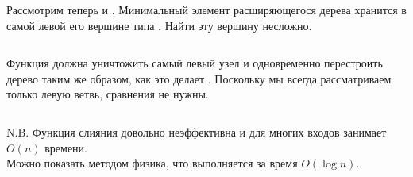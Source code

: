 \begin{frame}[fragile]{}
Рассмотрим теперь  и
. Минимальный элемент расширяющегося дерева
хранится в самой левой его вершине типа . Найти эту
вершину несложно.
\inputminted[firstline=42,lastline=44,gobble=2] {haskell}{code/SplayHeap.lhs}

Функция  должна уничтожить самый левый узел и
одновременно перестроить дерево таким же образом, как это делает
. Поскольку мы всегда рассматриваем только левую
ветвь, сравнения не нужны.
\inputminted[firstline=46,lastline=49,gobble=2] {haskell}{code/SplayHeap.lhs}


\end{frame}

\begin{frame}[fragile]{}
N.B. Функция слияния
 довольно неэффективна и для многих входов
занимает $O(n)$ времени.\\

Можно показать методом физика, что  выполняется за время
$O(\log n)$.
\end{frame}


